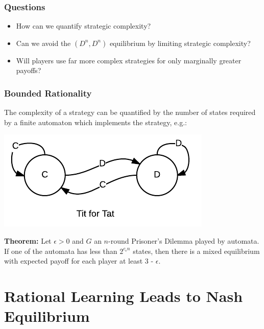 \documentclass{beamer}
\begin{document}
\begin{frame}
	\frametitle{Questions}
		\begin{itemize}
			\item How can we quantify strategic complexity?
			\item Can we avoid the $(D^n, D^n)$ equilibrium by limiting strategic complexity?
			\item Will players use far more complex strategies for only marginally greater payoffs?
		\end{itemize}
\end{frame}

\begin{frame}
	\frametitle{Bounded Rationality}
	The complexity of a strategy can be quantified by the number of states required by a finite automaton which implements the strategy, e.g.:
	
	\includegraphics[scale=0.5]{tit4tat}
	
	
	\noindent \textbf{Theorem:} Let $\epsilon > 0$ and $G$ an $n$-round Prisoner's Dilemma played by automata. If one of the automata has less than $2^{c_\epsilon n}$ states, then there is a mixed equilibrium with expected payoff for each player at least 3 - $\epsilon$.
	
	
\end{frame}

\section{Rational Learning Leads to Nash Equilibrium}

\subsection{}
\end{document}
